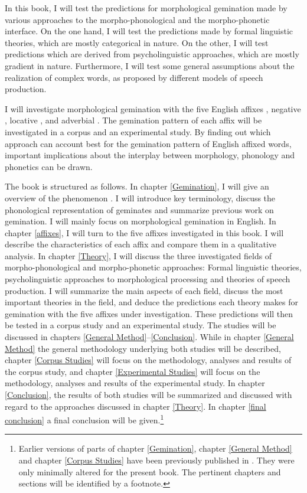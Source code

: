 In this book, I will test the predictions for morphological gemination made by various approaches to the morpho-phonological and the morpho-phonetic interface. 
On the one hand, I will test the predictions made by formal linguistic theories, which are mostly categorical in nature. On the other, I will test predictions which are derived from psycholinguistic approaches, which are mostly gradient in nature. Furthermore, I will test some general assumptions about the realization of complex words, as proposed by different models of speech production.

I will investigate morphological gemination with the five English affixes , negative , locative ,  and adverbial . The gemination pattern of each affix will be investigated in a corpus and an experimental study. 
By finding out which approach can account best for the gemination pattern of English affixed words, important implications about the interplay between morphology, phonology and phonetics can be drawn.



The book is structured as follows.
 In chapter \ref{Gemination}, I will give an overview of the phenomenon . I will introduce key terminology, discuss the phonological representation of geminates and summarize previous work on gemination. I will mainly focus on morphological gemination in English. 
 In chapter \ref{affixes}, I will turn to the five affixes investigated in this book. I will describe the characteristics of each affix and compare them in a qualitative analysis. 
  In  chapter \ref{Theory}, I will discuss the three investigated fields of morpho-phonological and morpho-phonetic approaches: Formal linguistic theories, psycholinguistic approaches to morphological processing and theories of speech production. I will summarize the main aspects of each field, discuss the most important theories in the field, and deduce the predictions each theory makes for gemination with the five affixes under investigation. 
  These predictions will then be tested in a corpus study and an experimental study. The studies will be discussed in chapters \ref{General Method}--\ref{Conclusion}.
   While in chapter \ref{General Method} the general methodology underlying both studies will be described, 
  chapter \ref{Corpus Studies} will focus on the methodology, analyses and results of the corpus study, and 
  chapter \ref{Experimental Studies} will focus on the methodology, analyses and results of the experimental study.
   In chapter \ref{Conclusion}, the results of both studies will be summarized and discussed with regard to the approaches discussed in chapter \ref{Theory}.
  In chapter \ref{final conclusion} a final conclusion will be given.\footnote{Earlier versions of parts of chapter \ref{Gemination}, chapter \ref{General Method} and chapter \ref{Corpus Studies} have been previously published in \cite{BenHedia.2017}. They were only minimally altered for the present book. The pertinent chapters and sections will be identified by a footnote.}




